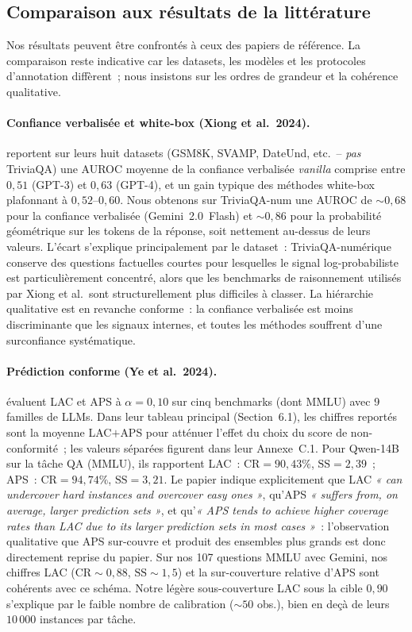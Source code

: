 \documentclass[12pt,a4paper]{article}
\begin{document}
\subsection{Comparaison aux résultats de la littérature}
\label{sec:comp_litterature}

Nos résultats peuvent être confrontés à ceux des papiers de référence. La comparaison reste indicative car les datasets, les modèles et les protocoles d'annotation diffèrent~; nous insistons sur les ordres de grandeur et la cohérence qualitative.

\paragraph{Confiance verbalisée et white-box (Xiong et al.\ 2024).}
\citet{xiong2024} reportent sur leurs huit datasets (GSM8K, SVAMP, DateUnd, etc.\ -- \emph{pas} TriviaQA) une AUROC moyenne de la confiance verbalisée \textit{vanilla} comprise entre $0{,}51$ (GPT-3) et $0{,}63$ (GPT-4), et un gain typique des méthodes white-box plafonnant à $0{,}52$--$0{,}60$. Nous obtenons sur TriviaQA-num une AUROC de $\sim 0{,}68$ pour la confiance verbalisée (Gemini~2.0~Flash) et $\sim 0{,}86$ pour la probabilité géométrique sur les tokens de la réponse, soit nettement au-dessus de leurs valeurs. L'écart s'explique principalement par le dataset~: TriviaQA-numérique conserve des questions factuelles courtes pour lesquelles le signal log-probabiliste est particulièrement concentré, alors que les benchmarks de raisonnement utilisés par Xiong et al.\ sont structurellement plus difficiles à classer. La hiérarchie qualitative est en revanche conforme~: la confiance verbalisée est moins discriminante que les signaux internes, et toutes les méthodes souffrent d'une surconfiance systématique.

\paragraph{Prédiction conforme (Ye et al.\ 2024).}
\citet{ye2024benchmarking} évaluent LAC et APS à $\alpha = 0{,}10$ sur cinq benchmarks (dont MMLU) avec 9 familles de LLMs. Dans leur tableau principal (Section~6.1), les chiffres reportés sont la moyenne LAC$+$APS pour atténuer l'effet du choix du score de non-conformité~; les valeurs séparées figurent dans leur Annexe~C.1. Pour Qwen-14B sur la tâche QA (MMLU), ils rapportent LAC~: $\mathrm{CR} = 90{,}43\%$, $\mathrm{SS} = 2{,}39$~; APS~: $\mathrm{CR} = 94{,}74\%$, $\mathrm{SS} = 3{,}21$. Le papier indique explicitement que LAC \emph{« can undercover hard instances and overcover easy ones »}, qu'APS \emph{« suffers from, on average, larger prediction sets »}, et qu'\emph{« APS tends to achieve higher coverage rates than LAC due to its larger prediction sets in most cases »}~: l'observation qualitative que APS sur-couvre et produit des ensembles plus grands est donc directement reprise du papier. Sur nos 107 questions MMLU avec Gemini, nos chiffres LAC ($\mathrm{CR} \sim 0{,}88$, $\mathrm{SS} \sim 1{,}5$) et la sur-couverture relative d'APS sont cohérents avec ce schéma. Notre légère sous-couverture LAC sous la cible $0{,}90$ s'explique par le faible nombre de calibration ($\sim 50$ obs.), bien en deçà de leurs $10\,000$ instances par tâche.
\end{document}
